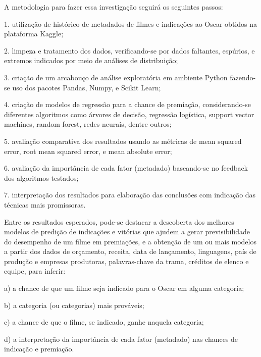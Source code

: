 A metodologia para fazer essa investigação seguirá os seguintes passos:\par

1. utilização de histórico de metadados de filmes e indicações ao Oscar obtidos na plataforma Kaggle;\par
2. limpeza e tratamento dos dados, verificando-se por dados faltantes, espúrios, e extremos indicados por meio de análises de distribuição;\par
3. criação de um arcabouço de análise exploratória em ambiente Python fazendo-se uso dos pacotes Pandas, Numpy, e Scikit Learn;\par
4. criação de modelos de regressão para a chance de premiação, considerando-se diferentes algoritmos como árvores de decisão, regressão logística, support vector machines, random forest, redes neurais, dentre outros;\par
5. avaliação comparativa dos resultados usando as métricas de mean squared error, root mean squared error, e mean absolute error;\par
6. avaliação da importância de cada fator (metadado) baseando-se no feedback dos algoritmos testados;\par
7. interpretação dos resultados para elaboração das conclusões com indicação das técnicas mais promissoras.\par
\par

Entre os resultados esperados, pode-se destacar a descoberta dos melhores modelos de predição de indicações e vitórias que ajudem a gerar previsibilidade do desempenho de um filme em premiações, e a obtenção de um ou mais modelos a partir dos dados de orçamento, receita, data de lançamento, linguagens, país de produção e empresas produtoras, palavras-chave da trama, créditos de elenco e equipe, para inferir:\par

a) a chance de que um filme seja indicado para o Oscar em alguma categoria;\par
b) a categoria (ou categorias) mais prováveis;\par
c) a chance de que o filme, se indicado, ganhe naquela categoria;\par
d) a interpretação da importância de cada fator (metadado) nas chances de indicação e premiação.\par
